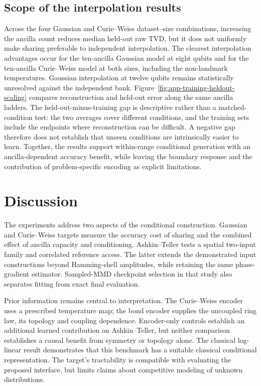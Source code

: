 \documentclass[pra,aps,10pt,twocolumn,floatfix,superscriptaddress,
notitlepage,longbibliography]{revtex4-2}
\begin{document}
\subsection{Scope of the interpolation results}

Across the four Gaussian and Curie--Weiss dataset--size combinations, increasing the ancilla count reduces median held-out raw TVD, but it does not uniformly make sharing preferable to independent interpolation. The clearest interpolation advantages occur for the ten-ancilla Gaussian model at eight qubits and for the ten-ancilla Curie--Weiss model at both sizes, including the non-landmark temperatures. Gaussian interpolation at twelve qubits remains statistically unresolved against the independent bank. Figure~\ref{fig:app-training-heldout-scaling} compares reconstruction and held-out error along the same ancilla ladders. The held-out-minus-training gap is descriptive rather than a matched-condition test: the two averages cover different conditions, and the training sets include the endpoints where reconstruction can be difficult. A negative gap therefore does not establish that unseen conditions are intrinsically easier to learn. Together, the results support within-range conditional generation with an ancilla-dependent accuracy benefit, while leaving the boundary response and the contribution of problem-specific encoding as explicit limitations.

\section{Discussion}
The experiments address two aspects of the conditional construction. Gaussian and Curie--Weiss targets measure the accuracy cost of sharing and the combined effect of ancilla capacity and conditioning. Ashkin--Teller tests a spatial two-input family and correlated reference access. The latter extends the demonstrated input constructions beyond Hamming-shell amplitudes, while retaining the same phase-gradient estimator. Sampled-MMD checkpoint selection in that study also separates fitting from exact final evaluation.

Prior information remains central to interpretation. The Curie--Weiss encoder uses a prescribed temperature map; the bond encoder supplies the uncoupled ring law, its topology and coupling dependence. Encoder-only controls establish an additional learned contribution on Ashkin--Teller, but neither comparison establishes a causal benefit from symmetry or topology alone. The classical log-linear result demonstrates that this benchmark has a suitable classical conditional representation. The target's tractability is compatible with evaluating the proposed interface, but limits claims about competitive modeling of unknown distributions.
\end{document}
